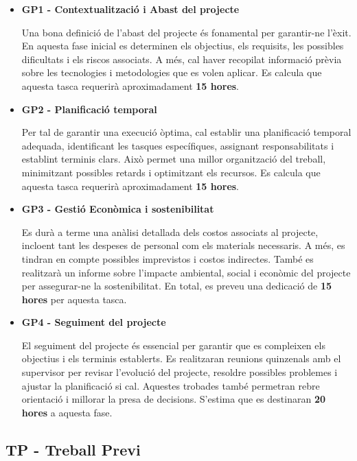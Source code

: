 \documentclass[a4paper,12pt]{report}
\begin{document}
\begin{itemize}
    \item \textbf{GP1 - Contextualització i Abast del projecte}
    
    Una bona definició de l’abast del projecte és fonamental per garantir-ne l’èxit.
    En aquesta fase inicial es determinen els objectius, els requisits, les possibles dificultats i els riscos associats.
    A més, cal haver recopilat informació prèvia sobre les tecnologies i metodologies que es volen aplicar.
    Es calcula que aquesta tasca requerirà aproximadament \textbf{15 hores}.

    \item \textbf{GP2 - Planificació temporal}
    
    Per tal de garantir una execució òptima, cal establir una planificació temporal adequada, identificant les tasques específiques, assignant responsabilitats i establint terminis clars.
    Això permet una millor organització del treball, minimitzant possibles retards i optimitzant els recursos.
    Es calcula que aquesta tasca requerirà aproximadament \textbf{15 hores}.

    \item \textbf{GP3 - Gestió Econòmica i sostenibilitat}
    
    Es durà a terme una anàlisi detallada dels costos associats al projecte, incloent tant les despeses de personal com els materials necessaris.
    A més, es tindran en compte possibles imprevistos i costos indirectes.
    També es realitzarà un informe sobre l’impacte ambiental, social i econòmic del projecte per assegurar-ne la sostenibilitat.
    En total, es preveu una dedicació de \textbf{15 hores} per aquesta tasca.

    \item \textbf{GP4 - Seguiment del projecte}
    
    El seguiment del projecte és essencial per garantir que es compleixen els objectius i els terminis establerts.
    Es realitzaran reunions quinzenals amb el supervisor per revisar l’evolució del projecte, resoldre possibles problemes i ajustar la planificació si cal.
    Aquestes trobades també permetran rebre orientació i millorar la presa de decisions.
    S’estima que es destinaran \textbf{20 hores} a aquesta fase.
\end{itemize}

\subsection{TP - Treball Previ}
\end{document}
